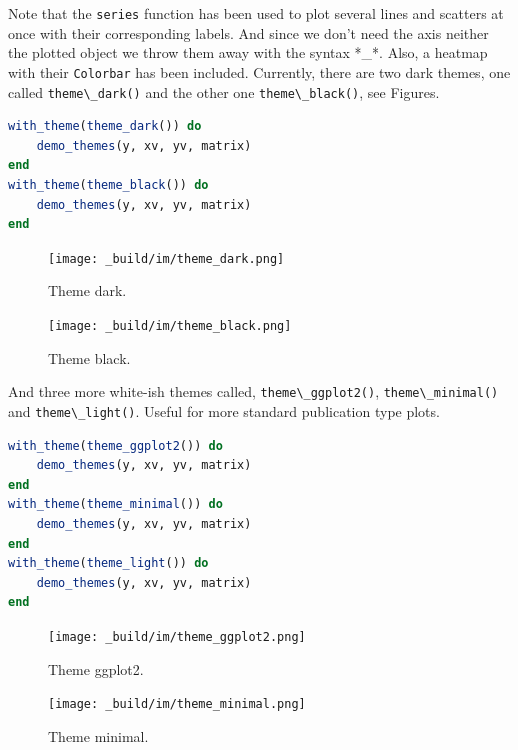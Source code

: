 \documentclass[
  notoc %
]{tufte-book}
\newcommand{\passthrough}[1]{#1}
\begin{document}
Note that the \passthrough{\lstinline!series!} function has been used to
plot several lines and scatters at once with their corresponding labels.
And since we don't need the axis neither the plotted object we throw
them away with the syntax *\_*. Also, a heatmap with their
\passthrough{\lstinline!Colorbar!} has been included. Currently, there
are two dark themes, one called \passthrough{\lstinline!theme\_dark()!}
and the other one \passthrough{\lstinline!theme\_black()!}, see Figures.

\begin{lstlisting}[language=Julia]
with_theme(theme_dark()) do
    demo_themes(y, xv, yv, matrix)
end
with_theme(theme_black()) do
    demo_themes(y, xv, yv, matrix)
end
\end{lstlisting}

\begin{figure}
\hypertarget{fig:theme_dark}{%
\centering
\texttt{[image: \_build/im/theme\_dark.png]}
\caption{Theme dark.}\label{fig:theme_dark}
}
\end{figure}

\begin{figure}
\hypertarget{fig:theme_black}{%
\centering
\texttt{[image: \_build/im/theme\_black.png]}
\caption{Theme black.}\label{fig:theme_black}
}
\end{figure}

And three more white-ish themes called,
\passthrough{\lstinline!theme\_ggplot2()!},
\passthrough{\lstinline!theme\_minimal()!} and
\passthrough{\lstinline!theme\_light()!}. Useful for more standard
publication type plots.

\begin{lstlisting}[language=Julia]
with_theme(theme_ggplot2()) do
    demo_themes(y, xv, yv, matrix)
end
with_theme(theme_minimal()) do
    demo_themes(y, xv, yv, matrix)
end
with_theme(theme_light()) do
    demo_themes(y, xv, yv, matrix)
end
\end{lstlisting}

\begin{figure}
\hypertarget{fig:theme_ggplot2}{%
\centering
\texttt{[image: \_build/im/theme\_ggplot2.png]}
\caption{Theme ggplot2.}\label{fig:theme_ggplot2}
}
\end{figure}

\begin{figure}
\hypertarget{fig:theme_minimal}{%
\centering
\texttt{[image: \_build/im/theme\_minimal.png]}
\caption{Theme minimal.}\label{fig:theme_minimal}
}
\end{figure}
\end{document}
